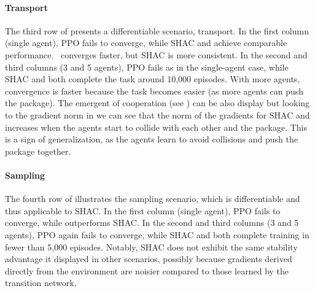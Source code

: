 \paragraph{Transport}
The third row of  presents a differentiable scenario, transport. In the first column (single agent), PPO fails to converge, while SHAC and \fname{} achieve comparable performance.\ \fname{} converges faster, but SHAC is more consistent. In the second and third columns (3 and 5 agents), PPO fails as in the single-agent case, while SHAC and \fname{} both complete the task around 10,000 episodes. With more agents, convergence is faster because the task becomes easier (as more agents can push the package). The emergent of cooperation (see ) can be also display but looking to the gradient norm in  we can see that the norm of the gradients for SHAC and \fname{} increases when the agents start to collide with each other and the package. This is a sign of generalization, as the agents learn to avoid collisions and push the package together.

\paragraph{Sampling}
The fourth row of  illustrates the sampling scenario, which is differentiable and thus applicable to SHAC\@. In the first column (single agent), PPO fails to converge, while \fname{} outperforms SHAC\@. In the second and third columns (3 and 5 agents), PPO again fails to converge, while SHAC and \fname{} both complete training in fewer than 5,000 episodes. Notably, SHAC does not exhibit the same stability advantage it displayed in other scenarios, possibly because gradients derived directly from the environment are noisier compared to those learned by the transition network.

